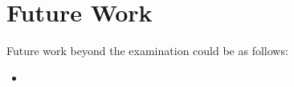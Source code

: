 
\chapter{Future Work}
Future work beyond the examination could be as follows:

\begin{itemize}
	\item 
\end{itemize}

\FloatBarrier